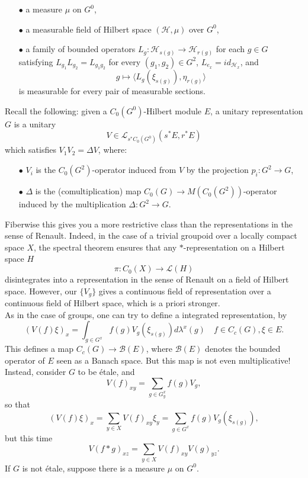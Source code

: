 \begin{itemize}
\item[$\bullet$] a measure $\mu$ on $G^0$,\\
\item[$\bullet$] a measurable field of Hilbert space $(\mathcal H , \mu)$ over $G^0$,\\
\item[$\bullet$] a family of bounded operators $L_g : \mathcal H_{s(g)} \rightarrow \mathcal H_{r(g)}$ for each $g\in G$ satisfying $L_{g_1} L_{g_2} = L_{g_1 g_2}$ for every $(g_1,g_2)\in G^2$, $L_{e_x}= id_{\mathcal H_x}$, and 
\[g\mapsto \langle L_g(\xi_{s(g)}) , \eta_{r(g)} \rangle \] 
is measurable for every pair of measurable sections. \\
\end{itemize}

Recall the following: given a $C_0(G^0)$-Hilbert module $E$, a unitary representation $G$ is a unitary 
\[V \in\mathcal L_{s^* C_0(G^0)}(s^* E, r^* E)\]
which satisfies $V_1 V_2 = \Delta V$, where:\\

\begin{itemize}
\item[$\bullet$] $V_i $ is the $C_0(G^{2})$-operator induced from $V$ by the projection $p_i : G^2 \rightarrow G$,\\
\item[$\bullet$] $\Delta $ is the (comultiplication) map $C_0(G)\rightarrow M(C_0(G^{2}))$-operator induced by the multiplication $\Delta : G^2 \rightarrow G$.\\
\end{itemize}

Fiberwise this gives you a more restrictive class than the representations in the sense of Renault. Indeed, in the case of a trivial groupoid over a locally compact space $X$, the spectral theorem ensures that any $*$-representation on a Hilbert space $H$
\[\pi : C_0(X) \rightarrow \mathcal L(H)\]
disintegrates into a representation in the sense of Renault on a field of Hilbert space. However, our $\{V_g\}$ gives a continuous field of representation over a continuous field of Hilbert space, which is a priori stronger.\\ 

As in the case of groups, one can try to define a integrated representation, by 
\[ (V(f)\xi )_x = \int_{g\in G^x} f(g) V_g (\xi_{s(g)}) d\lambda^x (g) \quad f \in C_c(G) , \xi \in E.\]
This defines a map $C_c(G)\rightarrow \mathcal B(E)$, where $\mathcal B (E)$ denotes the bounded operator of $E$ seen as a Banach space. But this map is not even multiplicative!\\

Instead, consider $G$ to be étale, and 
\[V(f)_{xy} = \sum_{g\in G_y^x} f(g) V_g ,\]
so that 
\[(V(f)\xi)_{x}= \sum_{y\in X} V(f)_{xy} \xi_y = \sum_{g\in G^x} f(g)V_g(\xi_{s(g)}),\]
but this time
\[V(f\ast g)_{xz} = \sum_{y\in X} V(f)_{xy} V(g)_{yz}.\]
If $G$ is not étale, suppose there is a measure $\mu$ on $G^0$.